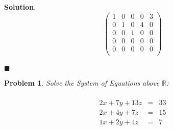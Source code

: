 \documentclass[12pt]{article}
\renewcommand{\=}[1]{\stackrel{#1}{=}} %
\newtheorem{p}{Problem}[section]
\theoremstyle{definition}
\newenvironment{s}{%
        \begin{trivlist} \item \textbf{Solution}. }{%
            \hspace*{\fill} $\blacksquare$\end{trivlist}}%
\begin{document}
\begin{s}
  \[
    \begin{pmatrix}
      1 & 0 & 0 & 0 & 3 \\
      0 & 1 & 0 & 4  & 0 \\
      0 & 0 & 1 & 0 & 0  \\
      0 & 0 & 0 & 0  & 0  \\
      0 & 0 & 0 & 0  & 0 \\
    \end{pmatrix}
  \]
  \\
\end{s}
\begin{p}
  \emph{Solve the System of Equations above $\mathbb{R}$:} \\
  \\
  \[
    \begin{array}{lcl} 
    2x +7y + 13z & = & 33 \\ 
    2x + 4y + 7z & = & 15 \\ 
    1x + 2y + 4z & = & 7 \\
    \end{array}
  \]
\end{p}
\end{document}
